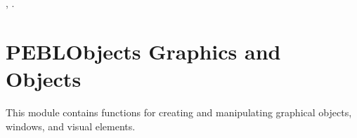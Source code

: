 \documentclass[letterpaper,10pt,english]{sphinxmanual}
\begin{document}
\sphinxAtStartPar
{}

\begin{sphinxVerbatim}[commandchars=\\\{\}]
\end{sphinxVerbatim}

\sphinxAtStartPar
{}

\sphinxAtStartPar
{}, \sphinxcode{\sphinxupquote{+}}.

\sphinxstepscope


\section{PEBLObjects \sphinxhyphen{} Graphics and Objects}
\label{\detokenize{reference/peblobjects:peblobjects-graphics-and-objects}}\label{\detokenize{reference/peblobjects::doc}}
\sphinxAtStartPar
This module contains functions for creating and manipulating graphical objects, windows, and visual elements.
\end{document}

